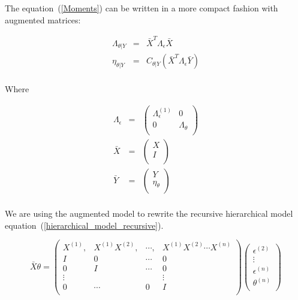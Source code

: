 \documentclass[final, paper=letter,5p,times,twocolumn]{elsarticle}
\theoremstyle{definition}
\begin{document}
The equation~(\ref{Moments}) can be written in a more compact fashion with augmented matrices:

\begin{equation}
  \left .
  \begin{array}{rcl}
    \Lambda_{\theta|Y} & = & \bar{X}^{T}\Lambda_{\epsilon}\bar{X} \\
    \eta_{\theta|Y}    & = & C_{\theta|Y} \left( \bar{X}^{T}\Lambda_{\epsilon}\bar{Y} \right)\\
  \end{array}
  \right .
  \label{Moments_augmented}
\end{equation}

Where

\begin{equation*}
  \left .
  \begin{array}{rcl}
    \Lambda_{\epsilon} & = & \left(
    \begin{array}{cc}
      \Lambda_{\epsilon}^{(1)} & 0 \\
      0 & \Lambda_{\theta} \\ 
    \end{array}
    \right) \\
   \bar{X} & = & \left(
    \begin{array}{c}
      X \\
      I \\ 
    \end{array}
    \right) \\
   \bar{Y} & = & \left(
    \begin{array}{cc}
      Y \\
      \eta_{\theta} \\ 
    \end{array}
    \right) \\
  \end{array}
  \right .
\end{equation*}

We are using the augmented model to rewrite the recursive hierarchical model equation~(\ref{hierarchical_model_recursive}).

\begin{equation*}
  \bar{X}\theta = 
  \left (
  \begin{array}{cccc}
    X^{(1)}, & X^{(1)}X^{(2)}, & \cdots, &    X^{(1)}X^{(2)} \cdots X^{(n)}  \\
    I & 0 & \cdots & 0 \\
    0 & I & \cdots & 0 \\
    \vdots &&& \vdots\\
    0 & \cdots & 0 & I\\
  \end{array}
  \right )
  \left (
  \begin{array}{c}
    \epsilon^{(2)}  \\
    \vdots \\
    \epsilon^{(n)}  \\
    \theta^{(n)}  \\
  \end{array}
  \right )
\end{equation*}
\end{document}
